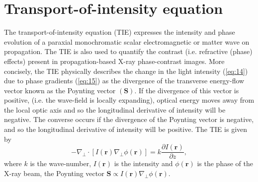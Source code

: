 \documentclass[10pt, a4paper, singlespacing]{report}
\begin{document}
\section{Transport-of-intensity equation}\label{TIE}
The transport-of-intensity equation (TIE) expresses the intensity and phase evolution of a paraxial monochromatic scalar electromagnetic or matter wave on propagation\cite{Pags2002}. The TIE is also used to quantify the contrast (i.e. refractive (phase) effects) present in propagation-based X-ray phase-contrast images\cite{PagsTutes}.
More concisely, the TIE physically describes the change in the light intensity (\ref{eq:14}) due to phase gradients (\ref{eq:15}) as the divergence of the transverse energy-flow vector known as the Poynting vector $(\textbf{S})$. If the divergence of this vector is positive, (i.e. the wave-field is locally expanding), optical energy moves away from the local optic axis and so the longitudinal derivative of
intensity will be negative. The converse occurs if the divergence of the Poynting vector is negative, and so the longitudinal derivative of intensity will be positive\cite{PagsTutes}. The TIE is given by
\begin{equation}\label{eq:16}
-\nabla_{\perp} \cdot [I(\mathbf{r}) \nabla_{\perp} \phi(\mathbf{r})] = k \frac{\partial I (\mathbf{r})}{\partial z},
\end{equation}
where $k$ is the wave-number, $I(\mathbf{r})$ is the intensity and $\phi(\mathbf{r})$ is the phase of the X-ray beam, the Poynting vector $\textbf{S} \propto I(\mathbf{r}) \nabla_{\perp} \phi(\mathbf{r})$.

\end{document}

